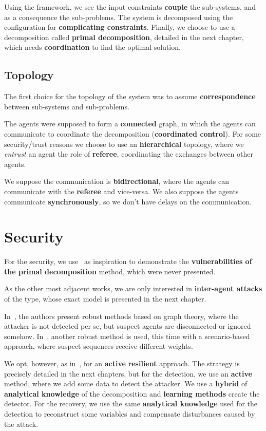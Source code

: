 \documentclass[../main.tex]{subfiles}
\begin{document}
Using the framework, we see the input constraints \textbf{couple} the sub-systems, and as a consequence the sub-problems.
The system is decomposed using the configuration for \textbf{complicating constraints}. Finally, we choose to use a decomposition called \textbf{primal decomposition}, detailed in the next chapter, which needs \textbf{coordination} to find the optimal solution.

\newpage
\subsection*{Topology}\label{sec:decomposition_chosen}
The first choice for the topology of the system was to assume \textbf{correspondence} between sub-systems and sub-problems.

The agents were supposed to form a \textbf{connected} graph, in which the agents can communicate to coordinate the decomposition (\textbf{coordinated control}).
For some security/trust reasons we choose to use an \textbf{hierarchical} topology, where we \emph{entrust} an agent the role of \textbf{referee}, coordinating the exchanges between other agents.

We suppose the communication is \textbf{bidirectional}, where the agents can communicate with the \textbf{referee} and vice-versa.
We also suppose the agents communicate \textbf{synchronously}, so we don't have delays on the communication.

\section*{Security}
For the security, we use~\cite{VelardeEtAl2017b,ChanfreutEtAl2018} as inspiration to demonstrate the \textbf{vulnerabilities of the primal decomposition} method, which were never presented.

As the other most adjacent works, we are only interested in \textbf{inter-agent attacks} of the \textbf{\fdi{}} type, whose exact model is presented in the next chapter.

In~\cite{VelardeEtAl2017b,VelardeEtAl2018}, the authors present robust methods based on graph theory, where the attacker is not detected per se, but suspect agents are disconnected or ignored somehow.
In~\cite{VelardeEtAl2017a,MaestreEtAl2021}, another robust method is used, this time with a scenario-based approach, where suspect sequences receive different weights.

We opt, however, as in~\cite{AnandutaEtAl2018,AnandutaEtAl2019,AnandutaEtAl2020},
for an \textbf{active} \textbf{resilient} approach.
The strategy is precisely detailed in the next chapters, but for the detection, we use an \textbf{active} method, where we add some data to detect the attacker.
We use a \textbf{hybrid} of \textbf{analytical knowledge} of the decomposition and \textbf{learning methods} create the detector.
For the recovery, we use the same \textbf{analytical knowledge} used for the detection to reconstruct some variables and compensate disturbances caused by the attack.
\end{document}
